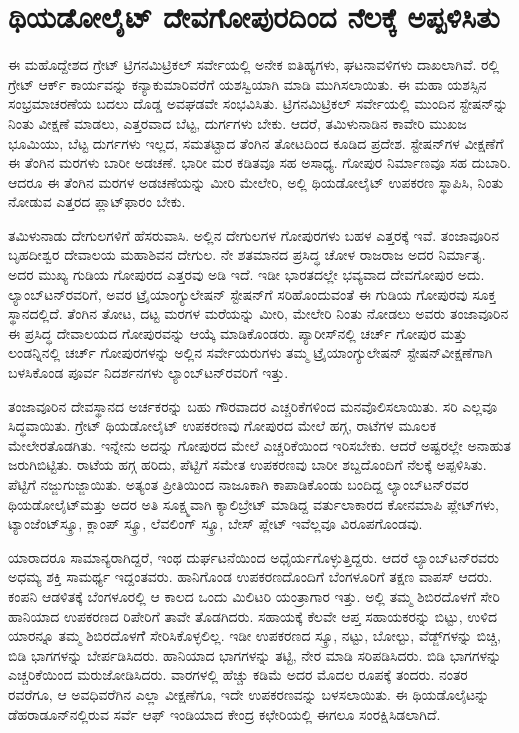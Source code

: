 
\chapter{ಥಿಯಡೋಲೈಟ್​ ದೇವಗೋಪುರದಿಂದ ನೆಲಕ್ಕೆ ಅಪ್ಪಳಿಸಿತು}

ಈ ಮಹೊದ್ದೇಶದ ಗ್ರೇಟ್​ ಟ್ರಿಗನಮಿಟ್ರಿಕಲ್​ ಸರ್ವೇಯಲ್ಲಿ ಅನೇಕ ಐತಿಹ್ಯಗಳು, ಘಟನಾವಳಿಗಳು ದಾಖಲಾಗಿವೆ. ರಲ್ಲಿ ಗ್ರೇಟ್​ ಆರ್ಕ್ ಕಾರ್ಯವನ್ನು ಕನ್ಯಾಕುಮಾರಿವರೆಗೆ ಯಶಸ್ವಿಯಾಗಿ ಮಾಡಿ ಮುಗಿಸಲಾಯಿತು. ಈ ಮಹಾ ಯಶಸ್ಸಿನ ಸಂಭ್ರಮಾಚರಣೆಯ ಬದಲು ದೊಡ್ಡ ಅವಘಡವೇ ಸಂಭವಿಸಿತು. ಟ್ರಿಗನಮಿಟ್ರಿಕಲ್​ ಸರ್ವೇಯಲ್ಲಿ ಮುಂದಿನ ಸ್ಟೇಷನ್​ನ್ನು ನಿಂತು ವೀಕ್ಷಣೆ ಮಾಡಲು, ಎತ್ತರವಾದ ಬೆಟ್ಟ, ದುರ್ಗಗಳು ಬೇಕು. ಆದರೆ, ತಮಿಳುನಾಡಿನ ಕಾವೇರಿ ಮುಖಜ ಭೂಮಿಯು, ಬೆಟ್ಟ ದುರ್ಗಗಳು ಇಲ್ಲದ, ಸಮತಟ್ಟಾದ ತೆಂಗಿನ ತೋಟದಿಂದ ಕೂಡಿದ ಪ್ರದೇಶ. ಸ್ಟೇಷನ್​ಗಳ ವೀಕ್ಷಣೆಗೆ ಈ ತೆಂಗಿನ ಮರಗಳು ಬಾರೀ ಅಡಚಣೆ. ಭಾರೀ ಮರ ಕಡಿತವೂ ಸಹ ಅಸಾಧ್ಯ. ಗೋಪುರ ನಿರ್ಮಾಣವೂ ಸಹ ದುಬಾರಿ. ಆದರೂ ಈ ತೆಂಗಿನ ಮರಗಳ ಅಡಚಣೆಯನ್ನು ಮೀರಿ ಮೇಲೇರಿ, ಅಲ್ಲಿ ಥಿಯಡೋಲೈಟ್​ ಉಪಕರಣ ಸ್ಥಾಪಿಸಿ, ನಿಂತು ನೋಡುವ ಎತ್ತರದ ಪ್ಲಾಟ್​ಫಾರಂ ಬೇಕು.

ತಮಿಳುನಾಡು ದೇಗುಲಗಳಿಗೆ ಹೆಸರುವಾಸಿ. ಅಲ್ಲಿನ ದೇಗುಲಗಳ ಗೋಪುರಗಳು ಬಹಳ ಎತ್ತರಕ್ಕೆ ಇವೆ. ತಂಜಾವೂರಿನ ಬೃಹದೀಶ್ವರ ದೇವಾಲಯ ಮಹಾಶಿವನ ದೇಗುಲ. ನೇ ಶತಮಾನದ ಪ್ರಸಿದ್ಧ ಚೋಳ ರಾಜರಾಜ ಅದರ ನಿರ್ಮಾತೃ. ಅದರ ಮುಖ್ಯ ಗುಡಿಯ ಗೋಪುರದ ಎತ್ತರವು  ಅಡಿ ಇದೆ. ಇಡೀ ಭಾರತದಲ್ಲೇ ಭವ್ಯವಾದ ದೇವಗೋಪುರ ಅದು. ಲ್ಯಾಂಬ್​ಟನ್​ರವರಿಗೆ, ಅವರ ಟ್ರೈಯಾಂಗ್ಯುಲೇಷನ್​ ಸ್ಟೇಷನ್​ಗೆ ಸರಿಹೊಂದುವಂತೆ ಈ ಗುಡಿಯ ಗೋಪುರವು ಸೂಕ್ತ ಸ್ಥಾನದಲ್ಲಿದೆ. ತೆಂಗಿನ ತೋಟ, ದಟ್ಟ ಮರಗಳ ಮರೆಯನ್ನು ಮೀರಿ, ಮೇಲೇರಿ ನಿಂತು ನೋಡಲು ಅವರು ತಂಜಾವೂರಿನ ಈ ಪ್ರಸಿದ್ಧ ದೇವಾಲಯದ ಗೋಪುರವನ್ನು ಆಯ್ಕೆ ಮಾಡಿಕೊಂಡರು. ಪ್ಯಾರೀಸ್​ನಲ್ಲಿ ಚರ್ಚ್ ಗೋಪುರ ಮತ್ತು ಲಂಡನ್ನಿನಲ್ಲಿ ಚರ್ಚ್ ಗೋಪುರಗಳನ್ನು ಅಲ್ಲಿನ ಸರ್ವೇಯರುಗಳು ತಮ್ಮ ಟ್ರೈಯಾಂಗ್ಯುಲೇಷನ್​ ಸ್ಟೇಷನ್​ ವೀಕ್ಷಣೆಗಾಗಿ ಬಳಸಿಕೊಂಡ ಪೂರ್ವ ನಿದರ್ಶನಗಳು ಲ್ಯಾಂಬ್​ಟನ್​ರವರಿಗೆ ಇತ್ತು.

ತಂಜಾವೂರಿನ ದೇವಸ್ಥಾನದ ಅರ್ಚಕರನ್ನು ಬಹು ಗೌರವಾದರ ಎಚ್ಚರಿಕೆಗಳಿಂದ ಮನವೊಲಿಸಲಾಯಿತು. ಸರಿ ಎಲ್ಲವೂ ಸಿದ್ಧವಾಯಿತು. ಗ್ರೇಟ್​ ಥಿಯಡೋಲೈಟ್​ ಉಪಕರಣವು ಗೋಪುರದ ಮೇಲೆ ಹಗ್ಗ, ರಾಟೆಗಳ ಮೂಲಕ ಮೇಲೇರತೊಡಗಿತು. ಇನ್ನೇನು ಅದನ್ನು ಗೋಪುರದ ಮೇಲೆ ಎಚ್ಚರಿಕೆಯಿಂದ ಇರಿಸಬೇಕು. ಆದರೆ ಅಷ್ಟರಲ್ಲೇ ಅನಾಹುತ ಜರುಗಿಬಿಟ್ಟಿತು. ರಾಟೆಯ ಹಗ್ಗ ಹರಿದು, ಪೆಟ್ಟಿಗೆ ಸಮೇತ ಉಪಕರಣವು ಬಾರೀ ಶಬ್ದದೊಂದಿಗೆ ನೆಲಕ್ಕೆ ಅಪ್ಪಳಿಸಿತು. ಪೆಟ್ಟಿಗೆ ನಜ್ಜುಗುಜ್ಜಾಯಿತು. ಅತ್ಯಂತ ಪ್ರೀತಿಯಿಂದ ನಾಜೂಕಾಗಿ ಕಾಪಾಡಿಕೊಂಡು ಬಂದಿದ್ದ ಲ್ಯಾಂಬ್​ಟನ್​ರವರ ಥಿಯಡೋಲೈಟ್​ ಮತ್ತು ಅದರ ಅತಿ ಸೂಕ್ಷ್ಮವಾಗಿ ಕ್ಯಾಲಿಬ್ರೇಟ್​ ಮಾಡಿದ್ದ ವರ್ತುಲಾಕಾರದ ಕೋನಮಾಪಿ ಪ್ಲೇಟ್​ಗಳು, ಟ್ಯಾಂಜೆಂಟ್​ ಸ್ಕ್ರೂ, ಕ್ಲಾಂಪ್​ ಸ್ಕ್ರೂ, ಲೆವಲಿಂಗ್​ ಸ್ಕ್ರೂ, ಬೇಸ್​ ಪ್ಲೇಟ್​ ಇವೆಲ್ಲವೂ ವಿರೂಪಗೊಂಡವು.

ಯಾರಾದರೂ ಸಾಮಾನ್ಯರಾಗಿದ್ದರೆ, ಇಂಥ ದುರ್ಘಟನೆಯಿಂದ ಅಧೈರ್ಯಗೊಳ್ಳುತ್ತಿದ್ದರು. ಆದರೆ ಲ್ಯಾಂಬ್​ಟನ್​ರವರು ಅಧಮ್ಯ ಶಕ್ತಿ ಸಾಮರ್ಥ್ಯ ಇದ್ದಂತವರು. ಹಾನಿಗೊಂಡ ಉಪಕರಣದೊಂದಿಗೆ ಬೆಂಗಳೂರಿಗೆ ತಕ್ಷಣ ವಾಪಸ್​ ಆದರು. ಕಂಪನಿ ಆಡಳಿತಕ್ಕೆ ಬೆಂಗಳೂರಲ್ಲಿ ಆ ಕಾಲದ ಒಂದು ಮಿಲಿಟರಿ ಯಂತ್ರಾಗಾರ ಇತ್ತು. ಅಲ್ಲಿ ತಮ್ಮ ಶಿಬಿರದೊಳಗೆ ಸೇರಿ ಹಾನಿಯಾದ ಉಪಕರಣದ ರಿಪೇರಿಗೆ ತಾವೇ ತೊಡಗಿದರು. ಸಹಾಯಕ್ಕೆ ಕೆಲವೇ ಆಪ್ತ ಸಹಾಯಕರನ್ನು ಬಿಟ್ಟು, ಉಳಿದ ಯಾರನ್ನೂ ತಮ್ಮ ಶಿಬಿರದೊಳಗೆೆ ಸೇರಿಸಿಕೊಳ್ಳಲಿಲ್ಲ. ಇಡೀ ಉಪಕರಣದ ಸ್ಕ್ರೂ, ನಟ್ಟು, ಬೋಲ್ಟು, ವೆಡ್ಜ್​ಗಳನ್ನು ಬಿಚ್ಚಿ, ಬಿಡಿ ಭಾಗಗಳನ್ನು ಬೇರ್ಪಡಿಸಿದರು. ಹಾನಿಯಾದ ಭಾಗಗಳನ್ನು ತಟ್ಟಿ, ನೇರ ಮಾಡಿ ಸರಿಪಡಿಸಿದರು. ಬಿಡಿ ಭಾಗಗಳನ್ನು ಎಚ್ಚರಿಕೆಯಿಂದ ಮರುಜೋಡಿಸಿದರು.  ವಾರಗಳಲ್ಲಿ ಹೆಚ್ಚು ಕಡಿಮೆ ಅದರ ಮೊದಲ ರೂಪಕ್ಕೆ ತಂದರು. ನಂತರ  ರವರೆಗೂ, ಆ ಅವಧಿವರೆಗಿನ ಎಲ್ಲಾ ವೀಕ್ಷಣೆಗೂ, ಇದೇ ಉಪಕರಣವನ್ನು ಬಳಸಲಾಯಿತು. ಈ ಥಿಯಡೊಲೈಟನ್ನು ಡೆಹರಾಡೂನ್​ನಲ್ಲಿರುವ ಸರ್ವೆ ಆಫ್​ ಇಂಡಿಯಾದ ಕೇಂದ್ರ ಕಛೇರಿಯಲ್ಲಿ ಈಗಲೂ ಸಂರಕ್ಷಿಸಿಡಲಾಗಿದೆ.

